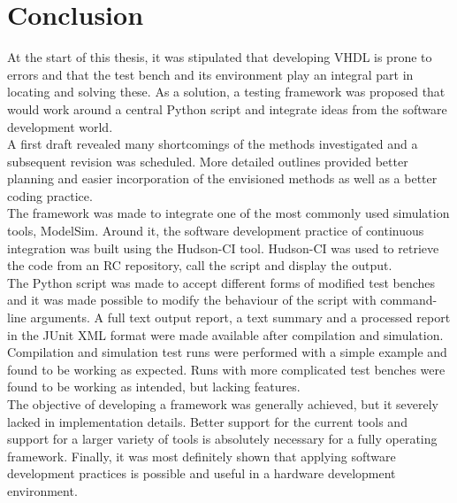\documentclass[11pt,british]{article}
\begin{document}


\newpage{}
\section{Conclusion}
At the start of this thesis, it was stipulated that developing \gls{VHDL} is prone to errors and that the test bench and its environment play an integral part in locating and solving these. As a solution, a testing framework was proposed that would work around a central Python script and integrate ideas from the software development world.
\\[\baselineskip]
A first draft revealed many shortcomings of the methods investigated and a subsequent revision was scheduled. More detailed outlines provided better planning and easier incorporation of the envisioned methods as well as a better coding practice.
\\[\baselineskip]
The framework was made to integrate one of the most commonly used simulation tools, ModelSim. Around it, the software development practice of continuous integration was built using the Hudson-CI tool. Hudson-CI was used to retrieve the code from an \gls{RC} repository, call the script and display the output.
\\[\baselineskip]
The Python script was made to accept different forms of modified test benches and it was made possible to modify the behaviour of the script with command-line arguments. A full text output report, a text summary and a processed report in the JUnit \gls{XML} format were made available after compilation and simulation.
\\[\baselineskip]
Compilation and simulation test runs were performed with a simple example and found to be working as expected. Runs with more complicated test benches were found to be working as intended, but lacking features.
\\[\baselineskip]
The objective of developing a framework was generally achieved, but it severely lacked in implementation details. Better support for the current tools and support for a larger variety of tools is absolutely necessary for a fully operating framework. Finally, it was most definitely shown that applying software development practices is possible and useful in a hardware development environment.

\end{document}

